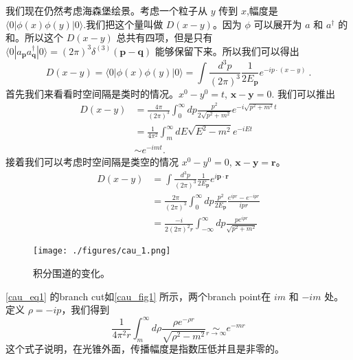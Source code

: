 
我们现在仍然考虑海森堡绘景。考虑一个粒子从 $y$ 传到 $x$,幅度是 $\langle 0 |\phi(x)\phi(y)| 0 \rangle$.我们把这个量叫做 $D(x-y)$。因为 $\phi$ 可以展开为 $a$ 和 $a^\dagger$ 的和。所以这个 $D(x-y)$ 总共有四项，但是只有 $\langle 0 | a_{\mathbf p} a^\dagger_{\mathbf q} | 0 \rangle = (2\pi)^3 \delta^{(3)}(\mathbf p - \mathbf q)$ 能够保留下来。所以我们可以得出
\begin{equation}
D(x-y)=\langle 0|\phi(x) \phi(y)| 0\rangle=\int \frac{d^{3} p}{(2 \pi)^{3}} \frac{1}{2 E_{\mathbf{p}}} e^{-i p \cdot(x-y)}~.
\end{equation}
首先我们来看看时空间隔是类时的情况。$x^0 - y^0 = t$, $\mathbf x - \mathbf y = 0$. 我们可以推出
\begin{equation}
\begin{aligned}
D(x-y) &=\frac{4 \pi}{(2 \pi)^{3}} \int_{0}^{\infty} d p \frac{p^{2}}{2 \sqrt{p^{2}+m^{2}}} e^{-i \sqrt{p^{2}+m^{2}} t} \\
&=\frac{1}{4 \pi^{2}} \int_{m}^{\infty} d E \sqrt{E^{2}-m^{2}} e^{-i E t} \\
& \sim e^{-i m t} .
\end{aligned}
\end{equation}
接着我们可以考虑时空间隔是类空的情况 $x^0 - y^0 = 0$, $\mathbf x - \mathbf y = \mathbf r$。
\begin{equation}\label{cau_eq1}
\begin{aligned}
D(x-y) &=\int \frac{d^{3} p}{(2 \pi)^{3}} \frac{1}{2 E_{\mathbf{p}}} e^{i \mathbf{p} \cdot \mathbf{r}} \\
&=\frac{2 \pi}{(2 \pi)^{3}} \int_{0}^{\infty} d p \frac{p^{2}}{2 E_{\mathbf{p}}} \frac{e^{i p r}-e^{-i p r}}{i p r} \\
&=\frac{-i}{2(2 \pi)^{2} r} \int_{-\infty}^{\infty} d p \frac{p e^{i p r}}{\sqrt{p^{2}+m^{2}}}
\end{aligned}
\end{equation}
\begin{figure}[ht]
\centering
\texttt{[image: ./figures/cau\_1.png]}
\caption{积分围道的变化。} \label{cau_fig1}
\end{figure}
\autoref{cau_eq1} 的branch cut如\autoref{cau_fig1} 所示，两个branch point在 $im$ 和 $-im$ 处。定义 $\rho = -ip$，我们得到
\begin{equation}
\frac{1}{4 \pi^{2} r} \int_{m}^{\infty} d \rho \frac{\rho e^{-\rho r}}{\sqrt{\rho^{2}-m^{2}}} \underset{r \rightarrow \infty}{\sim} e^{-m r}
\end{equation}
这个式子说明，在光锥外面，传播幅度是指数压低并且是非零的。

